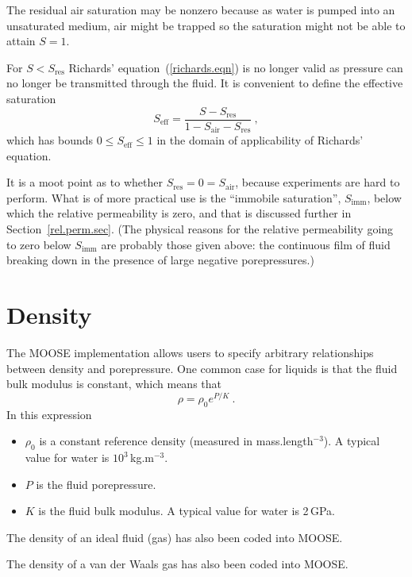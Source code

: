 \documentclass[]{scrreprt}
\begin{document}
The residual air saturation may be nonzero because as water is pumped
into an unsaturated medium, air might be trapped so the saturation
might not be able to attain $S=1$.

For $S<S_{\mathrm{res}}$ Richards' equation~(\ref{richards.eqn}) is no
longer valid as pressure can no longer be transmitted through the
fluid.  It is convenient to define the effective saturation
\begin{equation}
S_{\mathrm{eff}} = \frac{S - S_{\mathrm{res}}}{1 - S_{\mathrm{air}} -
  S_{\mathrm{res}}} \ ,
\end{equation}
which has bounds $0\leq S_{\mathrm{eff}} \leq 1$ in the domain of
applicability of Richards' equation.

It is a moot point as to whether
$S_{\mathrm{res}}=0=S_{\mathrm{air}}$, because experiments are hard to
perform.  What is of more practical use is the ``immobile
saturation'', $S_{\mathrm{imm}}$, below which the relative
permeability is zero, and that is discussed further in
Section~\ref{rel.perm.sec}.  (The physical reasons for the relative
permeability going to zero below $S_{\mathrm{imm}}$ are probably those
given above: the continuous film of fluid breaking down in the
presence of large negative porepressures.)


\section{Density}
\label{sec.density.constk}

The MOOSE implementation allows users to specify arbitrary
relationships between density and porepressure.  One common case
for liquids is that the fluid bulk modulus is constant, which means
that 
\begin{equation}
\rho = \rho_{0}e^{P/K} \ .
\end{equation}
In this expression
\begin{itemize}
\item $\rho_{0}$ is a constant reference density (measured in
  mass.length$^{-3}$).  A typical value for water is
  $10^{3}$\,kg.m$^{-3}$.
\item $P$ is the fluid porepressure.
\item $K$ is the fluid bulk modulus.  A typical value for water is
  2\,GPa.
\end{itemize}

The density of an ideal fluid (gas) has also been coded into MOOSE.

The density of a van der Waals gas has also been coded into MOOSE.
\end{document}
